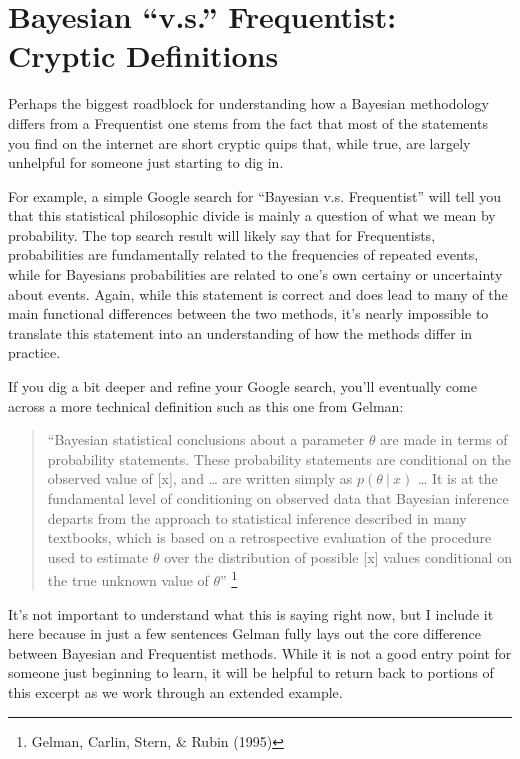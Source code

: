 \documentclass[12pt,twoside]{reedthesis}
\begin{document}
\hypertarget{bayesian-v.s.-frequentist-cryptic-definitions}{%
\section{Bayesian ``v.s.'' Frequentist: Cryptic Definitions}\label{bayesian-v.s.-frequentist-cryptic-definitions}}

Perhaps the biggest roadblock for understanding how a Bayesian methodology differs from a Frequentist one stems from the fact that most of the statements you find on the internet are short cryptic quips that, while true, are largely unhelpful for someone just starting to dig in.

For example, a simple Google search for ``Bayesian v.s. Frequentist'' will tell you that this statistical philosophic divide is mainly a question of what we mean by probability. The top search result will likely say that for Frequentists, probabilities are fundamentally related to the frequencies of repeated events, while for Bayesians probabilities are related to one's own certainy or uncertainty about events. Again, while this statement is correct and does lead to many of the main functional differences between the two methods, it's nearly impossible to translate this statement into an understanding of how the methods differ in practice.

If you dig a bit deeper and refine your Google search, you'll eventually come across a more technical definition such as this one from Gelman:
\begin{quote}
``Bayesian statistical conclusions about a parameter \(\theta\) are made in terms of probability statements. These probability statements are conditional on the observed value of {[}x{]}, and \ldots{} are written simply as \(p(\theta \ | \ x)\) \ldots{} It is at the fundamental level of conditioning on observed data that Bayesian inference departs from the approach to statistical inference described in many textbooks, which is based on a retrospective evaluation of the procedure used to estimate \(\theta\) over the distribution of possible {[}x{]} values conditional on the true unknown value of \(\theta\)'' \footnote{Gelman, Carlin, Stern, \& Rubin (1995)}
\end{quote}
It's not important to understand what this is saying right now, but I include it here because in just a few sentences Gelman fully lays out the core difference between Bayesian and Frequentist methods. While it is not a good entry point for someone just beginning to learn, it will be helpful to return back to portions of this excerpt as we work through an extended example.
\end{document}
